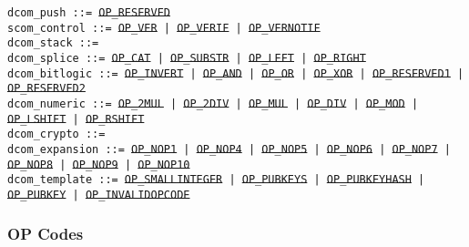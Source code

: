 \documentclass{article}
\begin{document}
\noindent \hangindent=0.7cm
\texttt{dcom\_push ::= \sout{OP\_RESERVED}} \\

\noindent \hangindent=0.7cm
\texttt{scom\_control ::=
 \sout{OP\_VER} | \sout{OP\_VERIF} | \sout{OP\_VERNOTIF}} \\

\noindent \hangindent=0.7cm
\texttt{dcom\_stack ::= } \\

\noindent \hangindent=0.7cm
\texttt{dcom\_splice ::=
  \sout{OP\_CAT }| \sout{OP\_SUBSTR} | \sout{OP\_LEFT} | \sout{OP\_RIGHT}
  } \\

\noindent \hangindent=0.7cm
\texttt{dcom\_bitlogic ::=
  \sout{OP\_INVERT} | \sout{OP\_AND} | \sout{OP\_OR} | \sout{OP\_XOR} |
  \sout{OP\_RESERVED1} | \sout{OP\_RESERVED2}} \\

\noindent \hangindent=0.7cm
\texttt{dcom\_numeric ::=
  \sout{OP\_2MUL} | \sout{OP\_2DIV} | \sout{OP\_MUL} |
  \sout{OP\_DIV} | \sout{OP\_MOD} | \sout{OP\_LSHIFT} | \sout{OP\_RSHIFT}} \\

\noindent \hangindent=0.7cm
\texttt{dcom\_crypto ::=} \\

\noindent \hangindent=0.7cm
\texttt{dcom\_expansion ::=
  \sout{OP\_NOP1} | \sout{OP\_NOP4} | \sout{OP\_NOP5} |
  \sout{OP\_NOP6} | \sout{OP\_NOP7} | \sout{OP\_NOP8} | \sout{OP\_NOP9} |
  \sout{OP\_NOP10}} \\

\noindent \hangindent=0.7cm
\texttt{dcom\_template ::=
  \sout{OP\_SMALLINTEGER} | \sout{OP\_PUBKEYS} | \sout{OP\_PUBKEYHASH} |
  \sout{OP\_PUBKEY} | \sout{OP\_INVALIDOPCODE}}


\pagebreak

\subsubsection{OP Codes}
\end{document}
